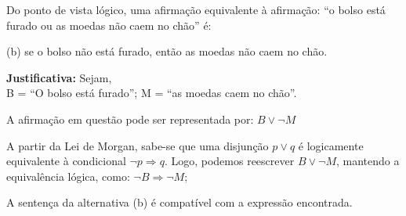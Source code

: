 \documentclass[12pt, a4paper, onecolumn]{exam}
\begin{document}
\begin{questions}
\begin{solution}
    \end{solution}

    \pagebreak
    
    \question[q9] Do ponto de vista lógico, uma afirmação equivalente à afirmação: “o bolso está furado ou as moedas não caem no chão” é: 
    

    \begin{solution}
        (b) se o bolso não está furado, então as moedas não caem no chão.

        \textbf{Justificativa:} Sejam, \\[0.5em]
            B = “O bolso está furado”;  \hfill
            M = “as moedas caem no chão”.

        A afirmação em questão pode ser representada por: \( B \vee \neg M \)

        A partir da Lei de Morgan, sabe-se que uma disjunção \( p \vee q \) é logicamente equivalente à condicional \( \neg p \Rightarrow q \).
        Logo, podemos reescrever \( B \vee \neg M \), mantendo a equivalência lógica, como: \( \neg B \Rightarrow \neg M \);
        
        A sentença da alternativa (b) é compatível com a expressão encontrada.


\end{solution}
\end{questions}
\end{document}
